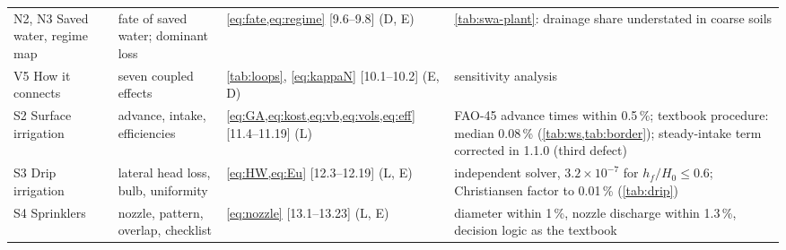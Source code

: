 \documentclass[preprint,12pt]{elsarticle}
\begin{document}
{\begin{longtable}{>{\raggedright\arraybackslash}p{2.3cm}>{\raggedright\arraybackslash}p{3.3cm}>{\raggedright\arraybackslash}p{4.6cm}>{\raggedright\arraybackslash}p{4.0cm}}
N2, N3 Saved water, regime map & fate of saved water; dominant loss & \cref{eq:fate,eq:regime} [9.6--9.8] (D, E) & \cref{tab:swa-plant}: drainage share understated in coarse soils\\
V5 How it connects & seven coupled effects & \cref{tab:loops}, \cref{eq:kappaN} [10.1--10.2] (E, D) & sensitivity analysis\\
S2 Surface irrigation & advance, intake, efficiencies & \cref{eq:GA,eq:kost,eq:vb,eq:vols,eq:eff} [11.4--11.19] (L) & FAO-45 advance times within 0.5\,\%; textbook procedure: median 0.08\,\% (\cref{tab:ws,tab:border}); steady-intake term corrected in 1.1.0 (third defect)\\
S3 Drip irrigation & lateral head loss, bulb, uniformity & \cref{eq:HW,eq:Eu} [12.3--12.19] (L, E) & independent solver, $3.2\times10^{-7}$ for $h_f/H_0\le0.6$; Christiansen factor to 0.01\,\% (\cref{tab:drip})\\
S4 Sprinklers & nozzle, pattern, overlap, checklist & \cref{eq:nozzle} [13.1--13.23] (L, E) & diameter within 1\,\%, nozzle discharge within 1.3\,\%, decision logic as the textbook\\\bottomrule
\end{longtable}}
\end{document}
